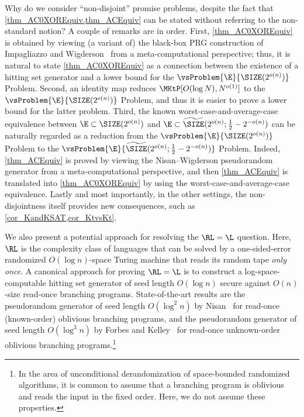\documentclass[11pt]{article}
\numberwithin{equation}{section}
\theoremstyle{definition}
\theoremstyle{plain}
\begin{document}
Why do we consider ``non-disjoint'' promise problems,
despite the fact that \cref{thm_AC0XOREquiv,thm_ACEquiv} can be stated
without referring to the non-standard notion?
A couple of remarks are in order.
First,
\cref{thm_AC0XOREquiv} is obtained by viewing (a variant of) the black-box PRG construction of Impagliazzo and Wigderson~\cite{ImpagliazzoW97_stoc_conf}
from a meta-computational perspective; thus, it is natural to state \cref{thm_AC0XOREquiv} as a connection between the existence of a hitting set generator and a lower bound for the $\vsProblem{\E}{\SIZE(2^{o(n)})}$ Problem.
Second,
an identity map reduces
$\MKtP[O(\log N), N^{o(1)}]$
to
the $\vsProblem{\E}{\SIZE(2^{o(n)})}$ Problem,
and thus it is easier to prove a lower bound for the latter problem.
Third,
the known worst-case-and-average-case equivalence between $\E \subset \SIZE(2^{o(n)})$ and $\E \subset \widetilde{\SIZE}(2^{o(n)}; \frac{1}{2} - 2^{-o(n)})$ \cite{SudanTV01_jcss_journals}
can be naturally regarded as a reduction from
the $\vsProblem{\E}{\SIZE(2^{o(n)})}$ Problem
to
the $\vsProblem{\E}{\widetilde{\SIZE}(2^{o(n)}; \frac{1}{2} - 2^{-o(n)})}$ Problem.
Indeed, \cref{thm_ACEquiv} is proved by viewing the Nisan--Wigderson pseudorandom generator from a meta-computational perspective,
and then \cref{thm_ACEquiv} is translated into \cref{thm_AC0XOREquiv}
by using the worst-case-and-average-case equivalence.
Lastly and most importantly,
in the other settings,
the non-disjointness itself provides new consequences, such as \cref{cor_KandKSAT,cor_KtvsKt}.

%



We also present a potential approach for resolving the $\RL = \L$ question.
Here, $\RL$ is the complexity class of languages that can be solved by a one-sided-error randomized $O(\log n)$-space Turing machine
that reads its random tape \emph{only once}.
A canonical approach for proving $\RL = \L$ is to construct a log-space-computable hitting set generator
of seed length $O(\log n)$ secure against $O(n)$-size read-once branching programs.
%
%
%
%
%
%
%
%
%
%
%
%
%
%
%
%
%
%
%
%
State-of-the-art results are the pseudorandom generator of seed length $O(\log^2 n)$ by Nisan~\cite{Nisan92_combinatorica_journals}
for read-once (known-order) oblivious branching programs,
and the pseudorandom generator of seed length $O(\log^3 n)$
by Forbes and Kelley~\cite{ForbesK18_focs_conf}
for read-once unknown-order oblivious branching programs.\footnote{ In the area of unconditional derandomization of space-bounded randomized algorithms, it is common to assume that a branching program is oblivious and reads the input in the fixed order.  Here, we do not assume these properties.  }
\end{document}
